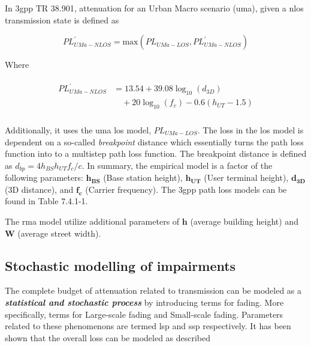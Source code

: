 In \gls{3gpp} TR 38.901, attenuation for an Urban Macro scenario (\gls{uma}), given a \gls{nlos} transmission state is defined as

\begin{equation}\label{eq:uma_nlos_pathloss_max}
     PL_{UMa-NLOS}^{'} = \text{max} \left( PL_{UMa-LOS}, PL_{UMa-NLOS}^{'} \right)
\end{equation}

Where

\begin{align}\label{eq:uma_nlos_pathloss}
\begin{split}
     PL_{UMa-NLOS}^{'} &= 13.54+39.08\log_{10}(d_{3D}) \\
      &\quad+ 20\log_{10}(f_c) - 0.6(h_{UT}-1.5) \\
  \end{split}
 \end{align}

Additionally, it uses the \gls{uma} \gls{los} model, $PL_{UMa-LOS}$. The loss in the \gls{los} model is dependent on a so-called \emph{breakpoint} distance which essentially turns the path loss function into to a multistep path loss function. The breakpoint distance is defined as $d_{bp} = 4 h_{BS} h_{UT} f_c / c$. In summary, the empirical model is a factor of the following parameters: $\mathbf{h_{BS}}$ (Base station height), $\mathbf{h_{UT}}$ (User terminal height), $\mathbf{d_{3D}}$ ($3$D distance), and $\mathbf{f_c}$ (Carrier frequency). The \gls{3gpp} path loss models can be found in \cite{3GPP38901} Table 7.4.1-1. 

The \gls{rma} model utilize additional parameters of $\mathbf{h}$ (average building height) and $\mathbf{W}$ (average street width).


\subsection{Stochastic modelling of impairments}\label{sec:stochastic_channel_model}
The complete budget of attenuation related to transmission can be modeled as a \emph{\textbf{statistical and stochastic process}} by introducing terms for fading. More specifically, terms for Large-scale fading and Small-scale fading. Parameters related to these phenomenons are termed \gls{lsp} and \gls{ssp} respectively. It has been shown that the overall loss can be modeled as described

